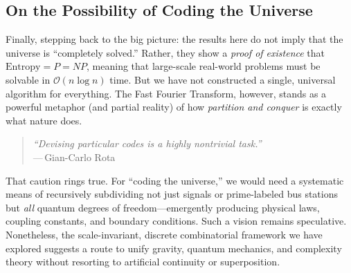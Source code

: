 \documentclass{report}
\begin{document}
\subsection*{On the Possibility of Coding the Universe}
Finally, stepping back to the big picture: the results here do not imply that the universe is “completely solved.” Rather, they show a \emph{proof of existence} that \(\mathrm{Entropy} = P = NP\), meaning that large-scale real-world problems must be solvable in \(\mathcal{O}(n \log n)\) time. But we have not constructed a single, universal algorithm for everything. The Fast Fourier Transform, however, stands as a powerful metaphor (and partial reality) of how \emph{partition and conquer} is exactly what nature does. 

\begin{quotation}
\noindent
\emph{``Devising particular codes is a highly nontrivial task.''} \\
---\,Gian-Carlo Rota
\end{quotation}

That caution rings true. For “coding the universe,” we would need a systematic means of recursively subdividing not just signals or prime-labeled bus stations but \emph{all} quantum degrees of freedom—emergently producing physical laws, coupling constants, and boundary conditions. Such a vision remains speculative. Nonetheless, the scale-invariant, discrete combinatorial framework we have explored suggests a route to unify gravity, quantum mechanics, and complexity theory without resorting to artificial continuity or superposition. 
\end{document}
